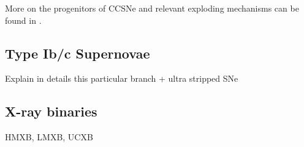 \documentclass[../../main/thesis_msc.tex]{subfiles}
\begin{document}
					More on the progenitors of CCSNe and relevant exploding mechanisms can be found in \cite{Smartt2009, Couch2017}.
				
				
			\subsection{Type Ib/c Supernovae}
			
				Explain in details this particular branch + ultra stripped SNe
				
			\subsection{X-ray binaries}
			
				HMXB, LMXB, UCXB
    
    
    
\end{document}
